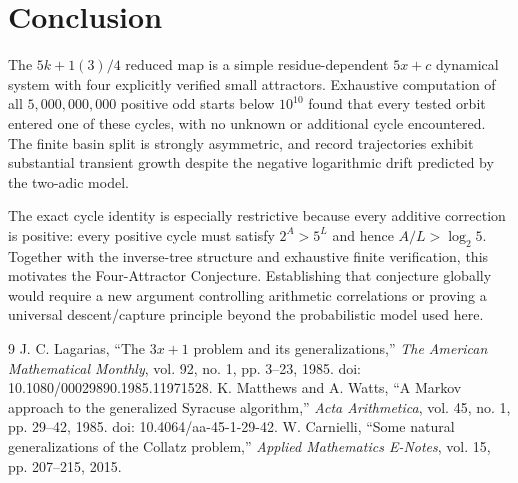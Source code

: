 \documentclass[11pt]{article}
\begin{document}
\section{Conclusion}
The $5k+1(3)/4$ reduced map is a simple residue-dependent $5x+c$ dynamical system with four explicitly verified small attractors. Exhaustive computation of all $5,000,000,000$ positive odd starts below $10^{10}$ found that every tested orbit entered one of these cycles, with no unknown or additional cycle encountered. The finite basin split is strongly asymmetric, and record trajectories exhibit substantial transient growth despite the negative logarithmic drift predicted by the two-adic model.

The exact cycle identity is especially restrictive because every additive correction is positive: every positive cycle must satisfy $2^A>5^L$ and hence $A/L>\log_2 5$. Together with the inverse-tree structure and exhaustive finite verification, this motivates the Four-Attractor Conjecture. Establishing that conjecture globally would require a new argument controlling arithmetic correlations or proving a universal descent/capture principle beyond the probabilistic model used here.

\begin{thebibliography}{9}
 J. C. Lagarias, ``The $3x+1$ problem and its generalizations,'' \emph{The American Mathematical Monthly}, vol. 92, no. 1, pp. 3--23, 1985. doi: 10.1080/00029890.1985.11971528.
 K. Matthews and A. Watts, ``A Markov approach to the generalized Syracuse algorithm,'' \emph{Acta Arithmetica}, vol. 45, no. 1, pp. 29--42, 1985. doi: 10.4064/aa-45-1-29-42.
 W. Carnielli, ``Some natural generalizations of the Collatz problem,'' \emph{Applied Mathematics E-Notes}, vol. 15, pp. 207--215, 2015.
\end{thebibliography}
\end{document}
